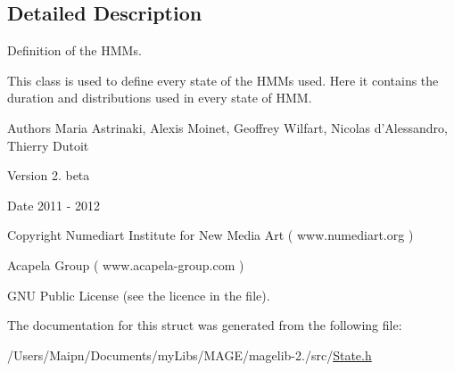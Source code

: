 \subsection{Detailed Description}
Definition of the H\-M\-Ms. 

This class is used to define every state of the H\-M\-Ms used. Here it contains the duration and distributions used in every state of H\-M\-M.

\begin{DoxyAuthor}{Authors}
Maria Astrinaki, Alexis Moinet, Geoffrey Wilfart, Nicolas d'Alessandro, Thierry Dutoit
\end{DoxyAuthor}
\begin{DoxyVersion}{Version}
2. beta 
\end{DoxyVersion}
\begin{DoxyDate}{Date}
2011 -\/ 2012 
\end{DoxyDate}
\begin{DoxyCopyright}{Copyright}
Numediart Institute for New Media Art ( www.\-numediart.\-org ) \par
 Acapela Group ( www.\-acapela-\/group.\-com ) \par
 G\-N\-U Public License (see the licence in the file). 
\end{DoxyCopyright}


The documentation for this struct was generated from the following file\-:\begin{DoxyCompactItemize}
\item 
/\-Users/\-Maipn/\-Documents/my\-Libs/\-M\-A\-G\-E/magelib-\/2./src/\hyperlink{_state_8h}{State.\-h}\end{DoxyCompactItemize}
